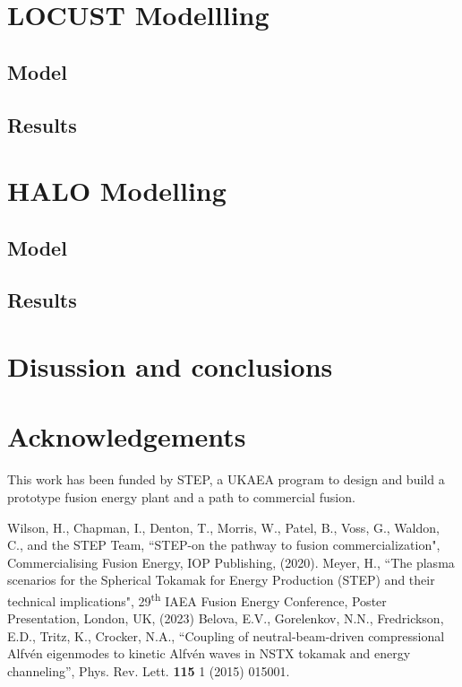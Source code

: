 \documentclass[10pt, a4paper, twoside]{article}
\begin{document}
\section{LOCUST Modellling}

\subsection{Model}

\subsection{Results}

\lipsum[4-5]

\section{HALO Modelling}

\subsection{Model}

\subsection{Results}

\lipsum[6-7]

\section{Disussion and conclusions}

\section*{Acknowledgements}

This work has been funded by STEP, a UKAEA program to design and build a prototype fusion energy plant and a path to commercial fusion.

\fontsize{9}{12}\selectfont
\setlength{\parskip}{0pt}
\begin{thebibliography}{9}
    Wilson, H., Chapman, I., Denton, T., Morris, W., Patel, B., Voss, G., Waldon, C., and the STEP Team, 
    ``STEP-on the pathway to fusion commercialization", 
    Commercialising Fusion Energy, 
    IOP Publishing, 
    (2020).
    Meyer, H.,
    ``The plasma scenarios for the Spherical Tokamak for Energy Production (STEP) and their technical implications",
    29\textsuperscript{th} 
    IAEA Fusion Energy Conference,
    Poster Presentation, 
    London, UK, 
    (2023)
    Belova, E.V., Gorelenkov, N.N., Fredrickson, E.D., Tritz, K., Crocker, N.A., 
    ``Coupling of neutral-beam-driven compressional Alfv\'en eigenmodes to kinetic Alfv\'en waves in NSTX tokamak and energy channeling'', 
    Phys. Rev. Lett. 
    \textbf{115} 1 
    (2015) 
    015001.
\end{thebibliography}
\end{document}
